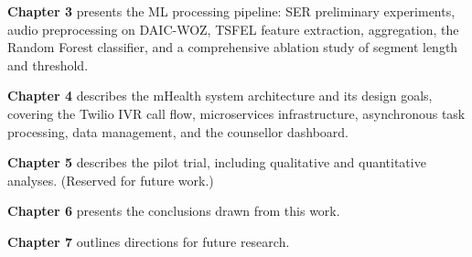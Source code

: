 \noindent \textbf{Chapter 3} presents the ML processing pipeline: SER preliminary experiments, audio preprocessing on DAIC-WOZ, TSFEL feature extraction, aggregation, the Random Forest classifier, and a comprehensive ablation study of segment length and threshold.

\noindent \textbf{Chapter 4} describes the mHealth system architecture and its design goals, covering the Twilio IVR call flow, microservices infrastructure, asynchronous task processing, data management, and the counsellor dashboard.

\noindent \textbf{Chapter 5} describes the pilot trial, including qualitative and quantitative analyses. (Reserved for future work.)

\noindent \textbf{Chapter 6} presents the conclusions drawn from this work.

\noindent \textbf{Chapter 7} outlines directions for future research.
